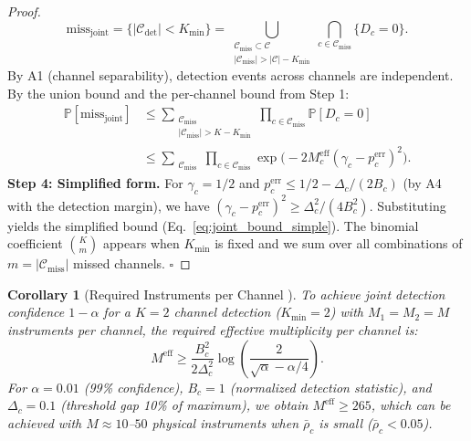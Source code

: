 \documentclass[11pt,a4paper]{article}
\newtheorem{corollary}[theorem]{Corollary}
\theoremstyle{definition}
\newcommand{\Pbb}{\mathbb{P}}
\begin{document}
\begin{proof}
\begin{equation}
\text{miss}_{\mathrm{joint}} = \bigl\{ |\mathcal{C}_{\mathrm{det}}| < K_{\mathrm{min}} \bigr\} = \bigcup_{\substack{\mathcal{C}_{\mathrm{miss}} \subset \mathcal{C} \\ |\mathcal{C}_{\mathrm{miss}}| > |\mathcal{C}| - K_{\mathrm{min}}}} \bigcap_{c \in \mathcal{C}_{\mathrm{miss}}} \{D_c = 0\}.
\end{equation}
By A1 (channel separability), detection events across channels are independent. By the union bound and the per-channel bound from Step 1:
\begin{align}
\Pbb[\text{miss}_{\mathrm{joint}}] &\leq \sum_{\substack{\mathcal{C}_{\mathrm{miss}} \\ |\mathcal{C}_{\mathrm{miss}}| > K - K_{\mathrm{min}}}} \prod_{c \in \mathcal{C}_{\mathrm{miss}}} \Pbb[D_c = 0] \nonumber \\
&\leq \sum_{\substack{\mathcal{C}_{\mathrm{miss}}}} \prod_{c \in \mathcal{C}_{\mathrm{miss}}} \exp\bigl(-2 M_c^{\mathrm{eff}} (\gamma_c - p_c^{\mathrm{err}})^2 \bigr).
\end{align}
\textbf{Step 4: Simplified form.}
For $\gamma_c = 1/2$ and $p_c^{\mathrm{err}} \leq 1/2 - \Delta_c/(2B_c)$ (by A4 with the detection margin), we have $(\gamma_c - p_c^{\mathrm{err}})^2 \geq \Delta_c^2/(4 B_c^2)$. Substituting yields the simplified bound (Eq.~\ref{eq:joint_bound_simple}). The binomial coefficient $\binom{K}{m}$ appears when $K_{\mathrm{min}}$ is fixed and we sum over all combinations of $m = |\mathcal{C}_{\mathrm{miss}}|$ missed channels. $\square$
\end{proof}
\begin{corollary}[Required Instruments per Channel ]\label{cor:required_instruments}
To achieve joint detection confidence $1 - \alpha$ for a $K=2$ channel detection ($K_{\mathrm{min}}=2$) with $M_1 = M_2 = M$ instruments per channel, the required effective multiplicity per channel is:
\begin{equation}\label{eq:required_instruments}
M^{\mathrm{eff}} \geq \frac{B_c^2}{2\Delta_c^2} \log\!\left(\frac{2}{\sqrt{\alpha} - \alpha/4}\right).
\end{equation}
For $\alpha = 0.01$ (99\% confidence), $B_c = 1$ (normalized detection statistic), and $\Delta_c = 0.1$ (threshold gap 10\% of maximum), we obtain $M^{\mathrm{eff}} \geq 265$, which can be achieved with $M \approx 10$--$50$ physical instruments when $\bar{\rho}_c$ is small ($\bar{\rho}_c < 0.05$).
\end{corollary}
\end{document}
